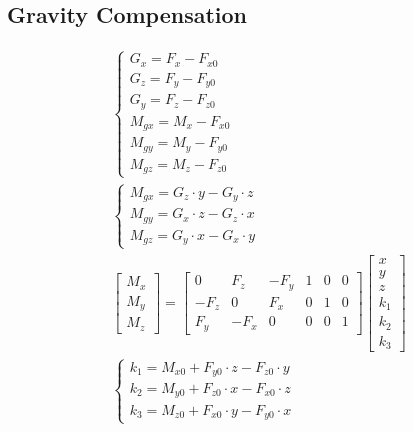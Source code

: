 \documentclass[12pt]{article}
\begin{document}
\begin{CJK}{UTF8}{bsmi}
\section{Gravity Compensation}
\begin{equation*}
\begin{split}
\left\{\begin{matrix}
G_x = F_x - F_{x0}\\ 
G_z = F_y - F_{y0}\\ 
G_y = F_z - F_{z0}\\ 
M_{gx} = M_x - F_{x0}\\ 
M_{gy} = M_y - F_{y0}\\ 
M_{gz} = M_z - F_{z0}
\end{matrix}\right.	\\
\left\{\begin{matrix}
M_{gx} = G_z \cdot y - G_y \cdot z\\ 
M_{gy} = G_x \cdot z - G_z \cdot x\\ 
M_{gz} = G_y \cdot x - G_x \cdot y
\end{matrix}\right.\\
\begin{bmatrix}
M_x\\
M_y\\
M_z
\end{bmatrix}
=
\begin{bmatrix}
0		&F_z	&-F_y	&1	&0	&0\\
-F_z	&0		&F_x	&0	&1	&0\\
F_y		&-F_x	&0		&0	&0	&1
\end{bmatrix}
\begin{bmatrix}
x\\
y\\
z\\
k_1\\
k_2\\
k_3
\end{bmatrix}\\
\left\{\begin{matrix}
k_1 = M_{x0} + F_{y0} \cdot z - F_{z0} \cdot y\\
k_2 = M_{y0} + F_{z0} \cdot x - F_{x0} \cdot z\\
k_3 = M_{z0} + F_{x0} \cdot y - F_{y0} \cdot x
\end{matrix}\right.\\
\end{split}
\end{equation*}


\end{CJK}
\end{document}
